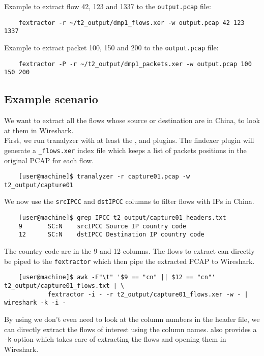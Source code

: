 \documentclass[documentation]{subfiles}
\begin{document}
Example to extract flow 42, 123 and 1337 to the {\tt output.pcap} file:
    \begin{verbatim}
    fextractor -r ~/t2_output/dmp1_flows.xer -w output.pcap 42 123 1337
    \end{verbatim}

Example to extract packet 100, 150 and 200 to the {\tt output.pcap} file:
    \begin{verbatim}
    fextractor -P -r ~/t2_output/dmp1_packets.xer -w output.pcap 100 150 200
    \end{verbatim}

\subsection{Example scenario}

We want to extract all the flows whose source or destination are in China, to look at them in Wireshark.\\

First, we run tranalyzer with at least the ,  and  plugins.
The findexer plugin will generate a {\tt \_flows.xer} index file which keeps a list of packets positions
in the original PCAP for each flow.

    \begin{verbatim}
    [user@machine]$ tranalyzer -r capture01.pcap -w t2_output/capture01
    \end{verbatim}

We now use the {\tt srcIPCC} and {\tt dstIPCC} columns to filter flows with IPs in China.

    \begin{verbatim}
    [user@machine]$ grep IPCC t2_output/capture01_headers.txt
    9       SC:N    srcIPCC Source IP country code
    12      SC:N    dstIPCC Destination IP country code
    \end{verbatim}

The country code are in the 9 and 12 columns. The flows to extract can directly be
piped to the {\tt fextractor} which then pipe the extracted PCAP to Wireshark.

{\small
    \begin{verbatim}
    [user@machine]$ awk -F"\t" '$9 == "cn" || $12 == "cn"' t2_output/capture01_flows.txt | \
            fextractor -i - -r t2_output/capture01_flows.xer -w - | wireshark -k -i -
    \end{verbatim}
}

By using  we don't even need to look at the column numbers in the header file, we can directly
extract the flows of interest using the column names. \tranrefpl{tawk} also provides a {\tt -k} option
which takes care of extracting the flows and opening them in Wireshark.
\end{document}
